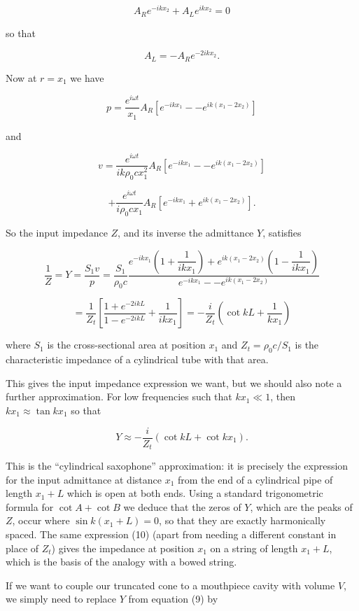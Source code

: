   $$A_R e^{-ikx_2} + A_L e^{ikx_2} = 0 \tag{5}$$ 

  so that 

  $$A_L=-A_R e^{-2ikx_2} . \tag{6}$$ 

  Now at $r=x_1$ we have 

  $$p=\dfrac{e^{i \omega t}}{x_1} A_R \left[ e^{-ikx_1} -- e^{ik(x_1-2x_2)} 
  \right] \tag{7}$$ 

  and 

  $$v= \dfrac{e^{i \omega t}}{ik\rho_0 c x_1^2} A_R \left[ e^{-ikx_1} -- 
  e^{ik(x_1-2x_2)} \right] $$ 

  $$+ \dfrac{e^{i \omega t}}{i\rho_0 c x_1} A_R \left[ e^{-ikx_1}+ 
  e^{ik(x_1-2x_2)} \right] . \tag{8}$$ 

  So the input impedance $Z$, and its inverse the admittance $Y$, satisfies 

  $$\dfrac{1}{Z}=Y=\dfrac{S_1v}{p}=\dfrac{S_1}{\rho_0 c} \dfrac{e^{-ikx_1} 
  \left(1+\dfrac{1}{ikx_1}\right) + e^{ik(x_1-2x_2)} \left(1-\dfrac{1}{ikx_1} 
  \right)}{e^{-ikx_1} -- e^{ik(x_1-2x_2)}}$$ 

  $$=\dfrac{1}{Z_t}\left[ \dfrac{1+e^{-2ikL}}{1-e^{-2ikL}}+ 
  \dfrac{1}{ikx_1}\right]=-\dfrac{i}{Z_t}\left(\cot kL + \dfrac{1}{kx_1} 
  \right) \tag{9}$$ 

  where $S_1$ is the cross-sectional area at position $x_1$ and $Z_t=\rho_0 
  c/S_1$ is the characteristic impedance of a cylindrical tube with that area. 

  This gives the input impedance expression we want, but we should also note a 
  further approximation. For low frequencies such that $kx_1 \ll 1$, then $kx_1 
  \approx \tan kx_1$ so that 

  $$Y \approx -\dfrac{i}{Z_t}\left(\cot kL + \cot kx_1 \right) . \tag{10}$$ 

  This is the ``cylindrical saxophone'' approximation: it is precisely the 
  expression for the input admittance at distance $x_1$ from the end of a 
  cylindrical pipe of length $x_1+L$ which is open at both ends. Using a 
  standard trigonometric formula for $\cot A + \cot B$ we deduce that the zeros 
  of $Y$, which are the peaks of $Z$, occur where $\sin k(x_1+L)=0$, so that 
  they are exactly harmonically spaced. The same expression (10) (apart from 
  needing a different constant in place of $Z_t$) gives the impedance at 
  position $x_1$ on a string of length $x_1+L$, which is the basis of the 
  analogy with a bowed string. 

  If we want to couple our truncated cone to a mouthpiece cavity with volume 
  $V$, we simply need to replace $Y$ from equation (9) by 

